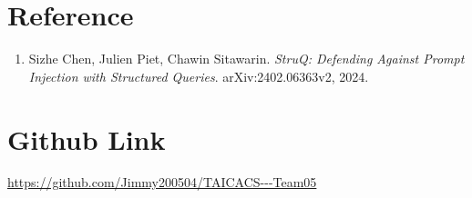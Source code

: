 \documentclass[11pt,a4paper]{article}
\begin{document}
\section{Reference}

\begin{enumerate}[leftmargin=*]
  \item Sizhe Chen, Julien Piet, Chawin Sitawarin. \textit{StruQ: Defending
  Against Prompt Injection with Structured Queries}. arXiv:2402.06363v2, 2024.
\end{enumerate}

\section{Github Link}

\url{https://github.com/Jimmy200504/TAICACS---Team05}
\end{document}
